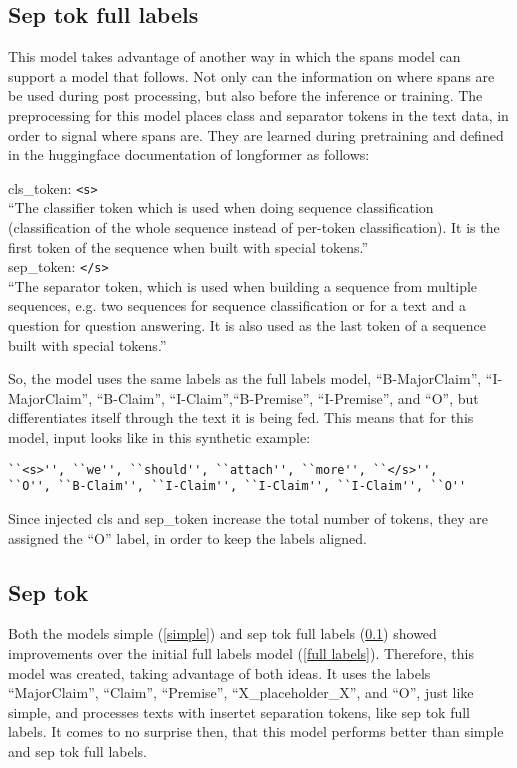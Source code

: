 \documentclass[12]{article}
\theoremstyle{mytheoremstyle}
\theoremstyle{mytheoremstyle}
\theoremstyle{myproblemstyle}
\begin{document}
  \subsection{Sep tok full labels} \label{sep tok full labels}
  This model takes advantage of another way in which the spans model can support a model that follows. Not only can the information on where spans are be used during post processing, but also before the inference or training. The preprocessing for this model places class and separator tokens in the text data, in order to signal where spans are. They are learned during pretraining and defined in the huggingface documentation of longformer as follows:
  \vspace{1ex}
  \begin{adjustwidth}{0.5cm}{0.5cm}
  cls\_token: \verb|<s>|\\
    ``The classifier token which is used when doing sequence classification (classification of the whole sequence instead of per-token classification). It is the first token of the sequence when built with special tokens.'' \cite{LongformerTokenizer} \vspace{1ex}\\
  sep\_token: \verb|</s>|\\
  ``The separator token, which is used when building a sequence from multiple sequences, e.g. two sequences for sequence classification or for a text and a question for question answering. It is also used as the last token of a sequence built with special tokens.'' \cite{LongformerTokenizer}\vspace{-2ex}\\
  \end{adjustwidth}
  So, the model uses the same labels as the full labels model, ``B-MajorClaim'', ``I-MajorClaim'', ``B-Claim'', ``I-Claim'',``B-Premise'', ``I-Premise'', and ``O'', but differentiates itself through the text it is being fed. This means that for this model, input looks like in this synthetic example:
  \begin{verbatim}
``<s>'', ``we'', ``should'', ``attach'', ``more'', ``</s>'', 
``O'', ``B-Claim'', ``I-Claim'', ``I-Claim'', ``I-Claim'', ``O''
  \end{verbatim}
  Since injected cls and sep\_token increase the total number of tokens, they are assigned the ``O'' label, in order to keep the labels aligned.
  \subsection{Sep tok} \label{sep tok}
  Both the models simple (\ref{simple}) and sep tok full labels (\ref{sep tok full labels}) showed improvements over the initial full labels model (\ref{full labels}). Therefore, this model was created, taking advantage of both ideas. It uses the labels ``MajorClaim'', ``Claim'', ``Premise'', ``X\_placeholder\_X'', and ``O'', just like simple, and processes texts with insertet separation tokens, like sep tok full labels. It comes to no surprise then, that this model performs better than simple and sep tok full labels.
\end{document}
